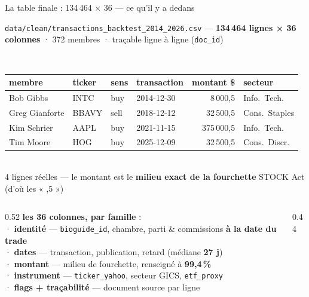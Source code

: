 \documentclass[11pt,aspectratio=169]{beamer}
\newcommand{\co}[1]{\texttt{#1}}
\begin{document}
\begin{frame}{La table finale : 134\,464 × 36 --- ce qu'il y a dedans}
  \centering
  \colorbox{helec}{\parbox{0.9\textwidth}{\scriptsize\color{white}\centering\vspace{0.6mm}
    \texttt{data/clean/transactions\_backtest\_2014\_2026.csv} --- \textbf{134\,464 lignes × 36 colonnes} ·
    372 membres · traçable ligne à ligne (\co{doc\_id})\vspace{0.6mm}}}\\[1.2mm]
  {\footnotesize
  \begin{tabular}{@{}llllrl@{}}
    \toprule
    \textbf{membre} & \textbf{ticker} & \textbf{sens} & \textbf{transaction} & \textbf{montant \$} & \textbf{secteur} \\
    \midrule
    Bob Gibbs & INTC & buy & 2014-12-30 & 8\,000,5 & Info.\ Tech. \\
    Greg Gianforte & BBAVY & sell & 2018-12-12 & 32\,500,5 & Cons.\ Staples \\
    Kim Schrier & AAPL & buy & 2021-11-15 & 375\,000,5 & Info.\ Tech. \\
    Tim Moore & HOG & buy & 2025-12-09 & 32\,500,5 & Cons.\ Discr. \\
    \bottomrule
  \end{tabular}}\\[0.6mm]
  {\scriptsize\color{black!60} 4 lignes réelles --- le montant est le \textbf{milieu exact de la fourchette}
   STOCK Act (d'où les « ,5 »)}\\[1.2mm]
  \begin{columns}[T]
    \begin{column}{0.52\textwidth}
      {\footnotesize\textbf{les 36 colonnes, par famille} :}\\[0.3mm]
      {\scriptsize
      · \textbf{identité} — \co{bioguide\_id}, chambre, parti \& commissions \textbf{à la date du trade}\\[0.3mm]
      · \textbf{dates} — transaction, publication, retard (médiane \textbf{27 j})\\[0.3mm]
      · \textbf{montant} — milieu de fourchette, renseigné à \textbf{99,4\,\%}\\[0.3mm]
      · \textbf{instrument} — \co{ticker\_yahoo}, secteur GICS, \co{etf\_proxy}\\[0.3mm]
      · \textbf{flags + traçabilité} — document source par ligne}
    \end{column}
    \begin{column}{0.44\textwidth}

\end{column}
\end{columns}
\end{frame}
\end{document}
